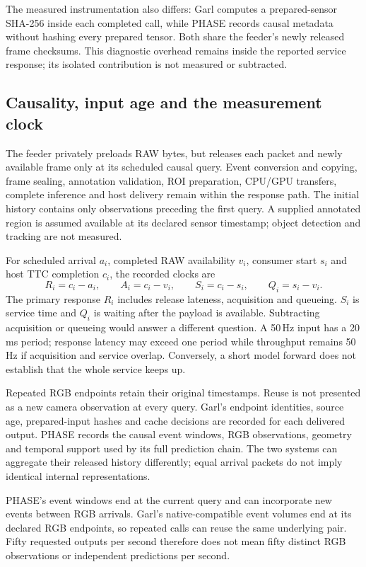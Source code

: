 The measured instrumentation also differs: Garl computes a prepared-sensor SHA-256 inside each completed call, while PHASE records causal metadata without hashing every prepared tensor. Both share the feeder's newly released frame checksums. This diagnostic overhead remains inside the reported service response; its isolated contribution is not measured or subtracted.

\subsection{Causality, input age and the measurement clock}

The feeder privately preloads RAW bytes, but releases each packet and newly available frame only at its scheduled causal query. Event conversion and copying, frame sealing, annotation validation, ROI preparation, CPU/GPU transfers, complete inference and host delivery remain within the response path. The initial history contains only observations preceding the first query. A supplied annotated region is assumed available at its declared sensor timestamp; object detection and tracking are not measured.

For scheduled arrival $a_i$, completed RAW availability $v_i$, consumer start $s_i$ and host TTC completion $c_i$, the recorded clocks are
\[
 R_i=c_i-a_i,\qquad A_i=c_i-v_i,\qquad S_i=c_i-s_i,
 \qquad Q_i=s_i-v_i.
\]
The primary response $R_i$ includes release lateness, acquisition and queueing. $S_i$ is service time and $Q_i$ is waiting after the payload is available. Subtracting acquisition or queueing would answer a different question. A 50\,Hz input has a 20\,ms period; response latency may exceed one period while throughput remains 50\,Hz if acquisition and service overlap. Conversely, a short model forward does not establish that the whole service keeps up.

Repeated RGB endpoints retain their original timestamps. Reuse is not presented as a new camera observation at every query. Garl's endpoint identities, source age, prepared-input hashes and cache decisions are recorded for each delivered output. PHASE records the causal event windows, RGB observations, geometry and temporal support used by its full prediction chain. The two systems can aggregate their released history differently; equal arrival packets do not imply identical internal representations.

PHASE's event windows end at the current query and can incorporate new events between RGB arrivals. Garl's native-compatible event volumes end at its declared RGB endpoints, so repeated calls can reuse the same underlying pair. Fifty requested outputs per second therefore does not mean fifty distinct RGB observations or independent predictions per second.

